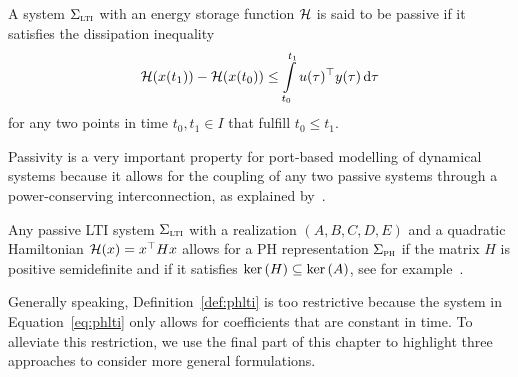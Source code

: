 \begin{definition}
    A system $\Sigma_{\textnormal{\scshape lti}}$ with an energy storage function $\mathcal{H}$ is said to be passive if it satisfies the dissipation inequality
    \begin{equation*}
        \mathcal{H}(x(t_1)) - \mathcal{H}(x(t_0)) \leq \int\limits_{t_0}^{t_1} u(\tau)^{\top} y(\tau) \mathop{}\!\mathrm{d} \tau
    \end{equation*}
    for any two points in time $t_0, t_1 \in I$ that fulfill $t_0 \leq t_1$.
\end{definition}

\begin{remark}
    Passivity is a very important property for port-based modelling of dynamical systems because it allows for the coupling of any two passive systems through a power-conserving interconnection, as explained by~\cite[Section~6.4]{Mehrmann2023}.
\end{remark}

\begin{remark}
    Any passive \ac{LTI} system $\Sigma_{\textnormal{\scshape lti}}$ with a realization $(A, B, C, D, E)$ and a quadratic Hamiltonian $\mathcal{H}(x) = x^{\top} H x$ allows for a \ac{PH} representation $\Sigma_{\textnormal{\scshape ph}}$ if the matrix $H$ is positive semidefinite and if it satisfies $\mathop{}\!\mathrm{ker}\left(H\right) \subseteq \mathop{}\!\mathrm{ker}\left(A\right)$, see for example~\cite[Theorem~7.1]{VanDerSchaft2014}.
\end{remark}

Generally speaking, Definition~\ref{def:phlti} is too restrictive because the system in Equation~\eqref{eq:phlti} only allows for coefficients that are constant in time.
To alleviate this restriction, we use the final part of this chapter to highlight three approaches to consider more general formulations.

